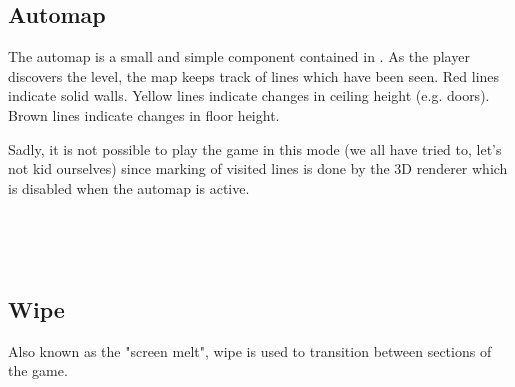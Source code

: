 \subsection{Automap}
The automap is a small and simple component contained in . As the player discovers the level, the map keeps track of lines which have been seen. Red lines indicate solid walls. Yellow lines indicate changes in ceiling height (e.g. doors). Brown lines indicate changes in floor height.\\
\par
Sadly, it is not possible to play the game in this mode (we all have tried to, let's not kid ourselves) since marking of visited lines is done by the 3D renderer which is disabled when the automap is active.\\
\par
{}
\par
{}\\
\par
{}\\
\par






\subsection{Wipe}
\label{label_melt}
Also known as the "screen melt", wipe is used to transition between sections of the game.

\par
{}

 \vspace{10pt}
\pagebreak


 \vspace{10pt}
\pagebreak

